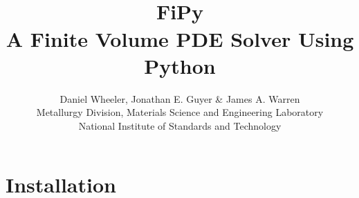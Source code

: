\documentclass{book}
\newcommand{\logo}{\rotatebox{4}{\textcolor{redish}{\( \varphi \)}}\kern-.74em\raisebox{-.15em}{\textcolor{bluish}{\( \pi\)}}}
\begin{document}
\frontmatter





\setlength{\fboxrule}{2\fboxrule}
\newlength{\BCL} %

\renewcommand{\sectionmark}[1]{\markboth{#1}{}}
\renewcommand{\subsectionmark}[1]{\markright{#1}}

\newenvironment{Ventry}[1]%
  {\begin{list}{}{%
    \renewcommand{\makelabel}[1]{\texttt{##1:}\hfil}%
    \settowidth{\labelwidth}{\texttt{#1:}}%
    \setlength{\leftmargin}{\labelsep}%
    \addtolength{\leftmargin}{\labelwidth}}}%
  {\end{list}}

\title{
\scalebox{5}{\logo} \\[2ex]
FiPy\\
{\large A Finite Volume PDE Solver Using Python} \\
}

\author{Daniel Wheeler, Jonathan E. Guyer \& James A. Warren \\[2ex]
Metallurgy Division, Materials Science and Engineering Laboratory\\
National Institute of Standards and Technology}

\maketitle

\tableofcontents

\mainmatter

\chapter{Installation}
\end{document}
